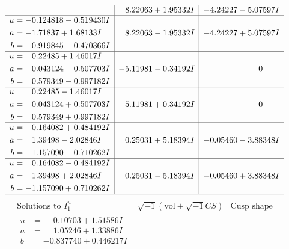 \documentclass[1p]{elsarticle_modified}
\theoremstyle{definition}
\newcommand{\I}{\sqrt{-1}}
\begin{document}
$$\begin{array}{c|c|c}
 & \phantom{-}8.22063 + 1.95332 I & -4.24227 - 5.07597 I \\ \hline\begin{aligned}
u &= -0.124818 - 0.519430 I \\
a &= -1.71837 + 1.68133 I \\
b &= \phantom{-}0.919845 - 0.470366 I\end{aligned}
 & \phantom{-}8.22063 - 1.95332 I & -4.24227 + 5.07597 I \\ \hline\begin{aligned}
u &= \phantom{-}0.22485 + 1.46017 I \\
a &= \phantom{-}0.043124 - 0.507703 I \\
b &= \phantom{-}0.579349 - 0.997182 I\end{aligned}
 & -5.11981 - 0.34192 I & \phantom{-0.000000 } 0 \\ \hline\begin{aligned}
u &= \phantom{-}0.22485 - 1.46017 I \\
a &= \phantom{-}0.043124 + 0.507703 I \\
b &= \phantom{-}0.579349 + 0.997182 I\end{aligned}
 & -5.11981 + 0.34192 I & \phantom{-0.000000 } 0 \\ \hline\begin{aligned}
u &= \phantom{-}0.164082 + 0.484192 I \\
a &= \phantom{-}1.39498 - 2.02846 I \\
b &= -1.157090 - 0.710262 I\end{aligned}
 & \phantom{-}0.25031 + 5.18394 I & -0.05460 - 3.88348 I \\ \hline\begin{aligned}
u &= \phantom{-}0.164082 - 0.484192 I \\
a &= \phantom{-}1.39498 + 2.02846 I \\
b &= -1.157090 + 0.710262 I\end{aligned}
 & \phantom{-}0.25031 - 5.18394 I & -0.05460 + 3.88348 I\\
 \hline 
 \end{array}$$\newpage$$\begin{array}{c|c|c}  
\text{Solutions to }I^u_{1}& \I (\text{vol} + \sqrt{-1}CS) & \text{Cusp shape}\\
 \hline 
\begin{aligned}
u &= \phantom{-}0.10703 + 1.51586 I \\
a &= \phantom{-}1.05246 + 1.33886 I \\
b &= -0.837740 + 0.446217 I\end{aligned}

\end{array}$$
\end{document}
